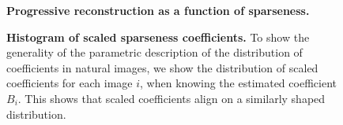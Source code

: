 \documentclass{article}
\begin{document}
\begin{figure}%
\caption{
{\bf Progressive reconstruction as a function of sparseness.}
\label{fig:EUVIP_lena_movie}}%
\end{figure}%
\begin{figure}%
\caption{
{\bf Histogram of scaled sparseness coefficients.} To show the generality of the parametric description of the distribution of coefficients in natural images, we show the distribution of scaled coefficients for each image $i$, when knowing the estimated coefficient $B_i$. This shows that scaled coefficients align on a similarly shaped distribution.
\label{fig:EUVIP_proba_scaled}}%
\end{figure}%


\fi
\end{document}
